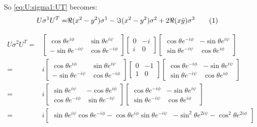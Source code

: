 \documentclass[]{article}
\newcommand\numberthis{\addtocounter{equation}{1}\tag{\theequation}}
\begin{document}
So \eqref{eq:U:sigma1:UT} becomes:
\begin{align*}
		U \sigma^1 U^T  =& \Re{(x^2-y^2)} \sigma^1 - \Im{(x^2-y^2)} \sigma^2 + 2 \Re({x\bar{y}}) \sigma^3 \numberthis \label{eq:U:sigma1:expanded}
\end{align*}

\begin{align*}
	U \sigma^2 U^T  =&  \begin{bmatrix}
		\cos{\theta} e^{i\phi}&\sin{\theta}e^{i\psi}\\
		-\sin{\theta}e^{-i\psi}&\cos{\theta} e^{-i\phi}
	\end{bmatrix} \begin{bmatrix}
		0&-i\\
		i&0
	\end{bmatrix} \begin{bmatrix}
		\cos{\theta} e^{-i\phi}&-\sin{\theta}e^{i\psi}\\
		\sin{\theta}e^{-i\psi}&\cos{\theta} e^{i\phi}
	\end{bmatrix}\\
	=&  i \begin{bmatrix}
		\cos{\theta} e^{i\phi}&\sin{\theta}e^{i\psi}\\
		-\sin{\theta}e^{-i\psi}&\cos{\theta} e^{-i\phi}
	\end{bmatrix} \begin{bmatrix}
		0&-1\\
		1&0
	\end{bmatrix} \begin{bmatrix}
		\cos{\theta} e^{-i\phi}&-\sin{\theta}e^{i\psi}\\
		\sin{\theta}e^{-i\psi}&\cos{\theta} e^{i\phi}
	\end{bmatrix}\\
	=&  i\begin{bmatrix}
		\sin{\theta}e^{i\psi}&-\cos{\theta} e^{i\phi}\\
		\cos{\theta} e^{-i\phi}&\sin{\theta}e^{-i\psi}
	\end{bmatrix} \begin{bmatrix}
		\cos{\theta} e^{-i\phi}&-\sin{\theta}e^{i\psi}\\
		\sin{\theta}e^{-i\psi}&\cos{\theta} e^{i\phi}
	\end{bmatrix}\\
   =& i \begin{bmatrix}
	   	\sin{\theta}e^{i\psi}\cos{\theta} e^{-i\phi}-\cos{\theta} e^{i\phi}\sin{\theta}e^{-i\psi}&-\sin^2{\theta}e^{2i\psi}-\cos^2{\theta} e^{2i\phi}\\

\end{bmatrix}
\end{align*}
\end{document}
